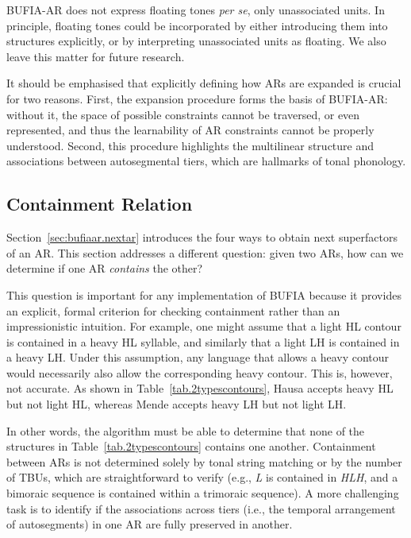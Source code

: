\documentclass{CUP-JNL-PHO}%
\theoremstyle{definition}
\numberwithin{equation}{section}
\theoremstyle{definition}
\begin{document}
BUFIA-AR does not express floating tones \textit{per se}, only unassociated
units. In principle, floating tones could be incorporated by either
introducing them into structures explicitly, or by interpreting
unassociated units as floating. We also leave this matter for future research.

It should be emphasised that explicitly defining how ARs are expanded
is crucial for two reasons. First, the expansion procedure forms the
basis of BUFIA-AR: without it, the space of possible constraints cannot
be traversed, or even represented, and thus the learnability of AR
constraints cannot be properly understood.  Second, this procedure
highlights the multilinear structure and associations between
autosegmental tiers, which are hallmarks of tonal phonology. 


\subsection{Containment Relation}\label{sec:bufiaar.arcontain}
Section~\ref{sec:bufiaar.nextar} introduces the four ways to obtain next 
superfactors of an AR. This section addresses a different question: 
given two ARs, how can we determine if one AR \textit{contains} the other? 

This question is important for any implementation of BUFIA because it
provides an explicit, formal criterion for checking containment rather
than an impressionistic intuition.  For example, one might assume that
a light HL contour is contained in a heavy HL syllable, and similarly
that a light LH is contained in a heavy LH. Under this assumption, any
language that allows a heavy contour would necessarily also allow the
corresponding heavy contour. This is, however, not accurate. As shown
in Table~\ref{tab.2typescontours}, Hausa accepts heavy HL but not
light HL, whereas Mende accepts heavy LH but not light LH.

In other words, the algorithm must be able to determine that none 
of the structures in Table~\ref{tab.2typescontours} contains 
one another. Containment between ARs is not determined solely 
by tonal string matching or by the number of TBUs, which are 
straightforward to verify (e.g., \textit{L} is contained in \textit{HLH}, 
and a bimoraic sequence is contained within a trimoraic sequence). A more  
challenging task is to identify if the associations across tiers (i.e., the 
temporal arrangement of autosegments) in one AR are fully preserved in another.
\end{document}
